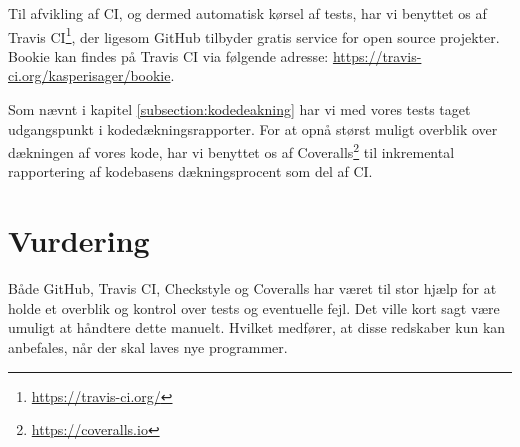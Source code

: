 Til afvikling af CI, og dermed automatisk kørsel af tests, har vi benyttet os af Travis CI\footnote{\url{https://travis-ci.org/}}, der ligesom GitHub tilbyder gratis service for open source projekter. Bookie kan findes på Travis CI via følgende adresse: \url{https://travis-ci.org/kasperisager/bookie}.

Som nævnt i kapitel \ref{subsection:kodedeakning} har vi med vores tests taget udgangspunkt i kodedækningsrapporter. For at opnå størst muligt overblik over dækningen af vores kode, har vi benyttet os af Coveralls\footnote{\url{https://coveralls.io}} til inkremental rapportering af kodebasens dækningsprocent som del af CI.

\section{Vurdering}

Både GitHub, Travis CI, Checkstyle og Coveralls har været til stor hjælp for at holde et overblik og kontrol over tests og eventuelle fejl. Det ville kort sagt være umuligt at håndtere dette manuelt. Hvilket medfører, at disse redskaber kun kan anbefales, når der skal laves nye programmer.
